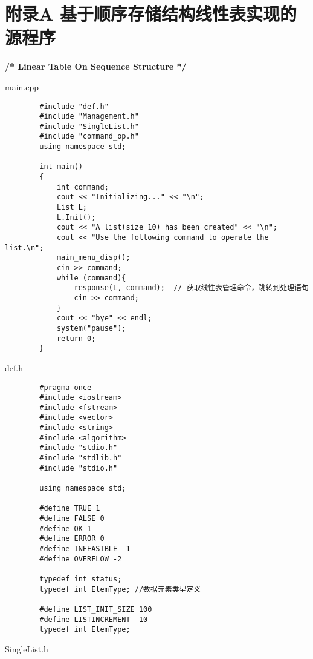 \documentclass[supercite]{Experimental_Report}
\begin{document}
	\section{附录A 基于顺序存储结构线性表实现的源程序}
	\begin{center}
		\textbf{/* Linear Table On Sequence Structure */}
	\end{center}
	main.cpp
	\begin{lstlisting}
		#include "def.h"
		#include "Management.h"
		#include "SingleList.h"
		#include "command_op.h"
		using namespace std;
		
		int main()
		{
			int command;
			cout << "Initializing..." << "\n";
			List L;
			L.Init();
			cout << "A list(size 10) has been created" << "\n";
			cout << "Use the following command to operate the list.\n";
			main_menu_disp();
			cin >> command;
			while (command){
				response(L, command);  // 获取线性表管理命令，跳转到处理语句
				cin >> command;
			}
			cout << "bye" << endl;
			system("pause");
			return 0;
		}
	\end{lstlisting}
	def.h
	\begin{lstlisting}
		#pragma once
		#include <iostream>
		#include <fstream>
		#include <vector>
		#include <string>
		#include <algorithm>
		#include "stdio.h"
		#include "stdlib.h"
		#include "stdio.h"
		
		using namespace std;
		
		#define TRUE 1
		#define FALSE 0
		#define OK 1
		#define ERROR 0
		#define INFEASIBLE -1
		#define OVERFLOW -2
		
		typedef int status;
		typedef int ElemType; //数据元素类型定义
		
		#define LIST_INIT_SIZE 100
		#define LISTINCREMENT  10
		typedef int ElemType;
	\end{lstlisting}
	SingleList.h
\end{document}

